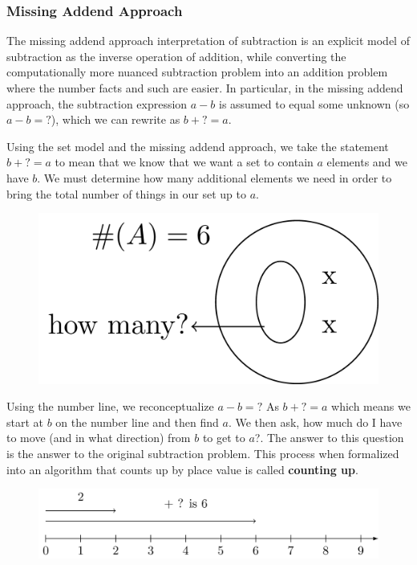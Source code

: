 \documentclass[
]{book}
\theoremstyle{definition}
\theoremstyle{definition}
\theoremstyle{definition}
\theoremstyle{definition}
\theoremstyle{remark}
\begin{document}
\hypertarget{missing-addend-approach}{%
\subsubsection*{Missing Addend Approach}\label{missing-addend-approach}}

The missing addend approach interpretation of subtraction is an explicit model of subtraction as the inverse operation of addition, while converting the computationally more nuanced subtraction problem into an addition problem where the number facts and such are easier. In particular, in the missing addend approach, the subtraction expression \(a-b\) is assumed to equal some unknown (so \(a-b=?\)), which we can rewrite as \(b+?=a\).

Using the set model and the missing addend approach, we take the statement \(b+?=a\) to mean that we know that we want a set to contain \(a\) elements and we have \(b\). We must determine how many additional elements we need in order to bring the total number of things in our set up to \(a\).

\begin{figure}

{\centering \includegraphics[width=0.4\linewidth]{tikz/subtraction-model-missingaddend-set} 

}

\end{figure}

Using the number line, we reconceptualize \(a-b=?\) As \(b+?=a\) which means we start at \(b\) on the number line and then find \(a\). We then ask, how much do I have to move (and in what direction) from \(b\) to get to \(a\)?. The answer to this question is the answer to the original subtraction problem. This process when formalized into an algorithm that counts up by place value is called \textbf{counting up}.

\begin{figure}

{\centering \includegraphics[width=0.8\linewidth]{tikz/subtraction-model-missingaddend-numberline} 

}

\end{figure}
\end{document}
